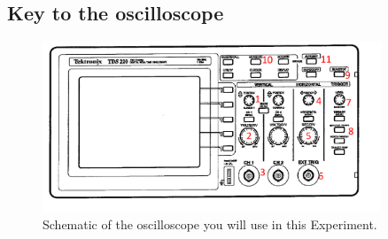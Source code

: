 \subsection*{Key to the oscilloscope}

\begin{figure}[h!]
        \centering
            \includegraphics[width=0.9\textwidth]{./Exp1-10/pic/scope_label.pdf}
        \caption{Schematic of the oscilloscope you will use in this Experiment.}
        \label{fig:osc}
\end{figure}

